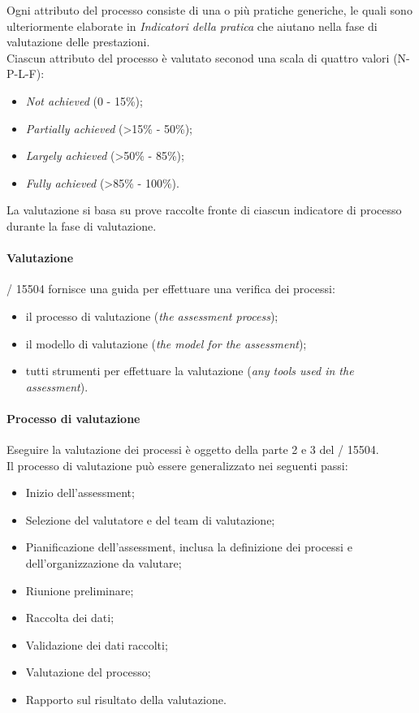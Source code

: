   Ogni attributo del processo consiste di una o più pratiche generiche, le quali sono ulteriormente elaborate in \emph{Indicatori della pratica} che aiutano nella fase di valutazione delle prestazioni.
  \\Ciascun attributo del processo è valutato seconod una scala di quattro valori (N-P-L-F):
  \begin{itemize}
    \item \emph{Not achieved} (0 - 15\%);
    \item \emph{Partially achieved} (>15\% - 50\%);
    \item \emph{Largely achieved} (>50\% - 85\%);
    \item \emph{Fully achieved} (>85\% - 100\%).
  \end{itemize}
  La valutazione si basa su prove raccolte fronte di ciascun indicatore di processo durante la fase di valutazione.\\

  \paragraph{Valutazione}
  / 15504 fornisce una guida per effettuare una verifica dei processi:
  \begin{itemize}
    \item il processo di valutazione (\emph{the assessment process});
    \item il modello di valutazione (\emph{the model for the assessment});
    \item tutti strumenti per effettuare la valutazione (\emph{any tools used in the assessment}).
  \end{itemize}
  \paragraph{Processo di valutazione}
  Eseguire la valutazione dei processi è oggetto della parte 2 e 3 del / 15504.\\
  Il processo di valutazione può essere generalizzato nei seguenti passi:
  \begin{itemize}
    \item Inizio dell'assessment;
    \item Selezione del valutatore e del team di valutazione;
    \item Pianificazione dell'assessment, inclusa la definizione dei processi e dell'organizzazione da valutare;
    \item Riunione preliminare;
    \item Raccolta dei dati;
    \item Validazione dei dati raccolti;
    \item Valutazione del processo;
    \item Rapporto sul risultato della valutazione.
  \end{itemize}

